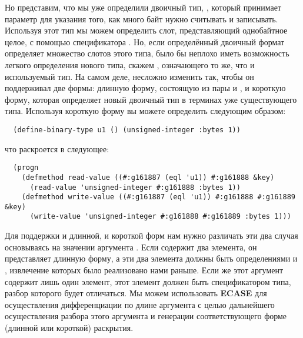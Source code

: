 Но представим, что мы уже определили двоичный тип, , который
принимает параметр  для указания того, как много байт нужно считывать и
записывать. Используя этот тип мы можем определить слот, представляющий однобайтное целое,
с помощью спецификатора . Но, если определённый двоичный
формат определяет множество слотов этого типа, было бы неплохо иметь возможность легкого
определения нового типа, скажем , означающего то же, что и используемый тип. На
самом деле, несложно изменить  так, чтобы он поддерживал две
формы: длинную форму, состоящую из пары  и , и короткую форму,
которая определяет новый двоичный тип в терминах уже существующего типа. Используя
короткую форму  вы можете определить  следующим образом:

\begin{lstlisting}
  (define-binary-type u1 () (unsigned-integer :bytes 1))
\end{lstlisting}

что раскроется в следующее:

\begin{lstlisting}
  (progn
    (defmethod read-value ((#:g161887 (eql 'u1)) #:g161888 &key)
      (read-value 'unsigned-integer #:g161888 :bytes 1))
    (defmethod write-value ((#:g161887 (eql 'u1)) #:g161888 #:g161889 &key)
      (write-value 'unsigned-integer #:g161888 #:g161889 :bytes 1)))
\end{lstlisting}

Для поддержки и длинной, и короткой форм  нам нужно различать эти
два случая основываясь на значении аргумента . Если  содержит два
элемента, он представляет длинную форму, а эти два элемента должны быть определениями
 и , извлечение которых было реализовано нами раньше. Если же
этот аргумент содержит лишь один элемент, этот элемент должен быть спецификатором типа,
разбор которого будет отличаться. Мы можем использовать \textbf{ECASE} для осуществления
дифференциации по длине аргумента  с целью дальнейшего осуществления разбора
этого аргумента и генерации соответствующего форме (длинной или короткой) раскрытия.

